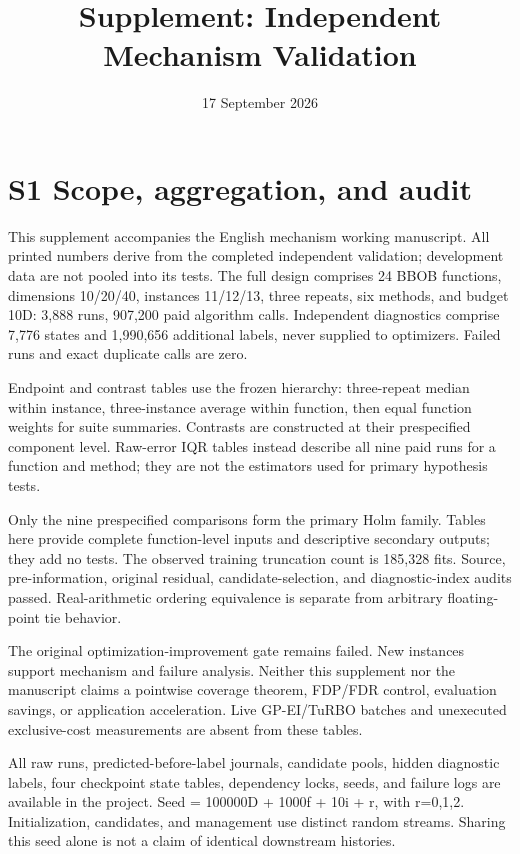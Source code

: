 \documentclass[11pt,a4paper]{article}
\title{Supplement: Independent Mechanism Validation}
\author{}
\date{17 September 2026}
\begin{document}
\maketitle

\hypertarget{s1-scope-aggregation-and-audit}{%
\section{S1 Scope, aggregation, and
audit}\label{s1-scope-aggregation-and-audit}}

This supplement accompanies the English mechanism working manuscript.
All printed numbers derive from the completed independent validation;
development data are not pooled into its tests. The full design
comprises 24 BBOB functions, dimensions 10/20/40, instances 11/12/13,
three repeats, six methods, and budget 10D: 3,888 runs, 907,200 paid
algorithm calls. Independent diagnostics comprise 7,776 states and
1,990,656 additional labels, never supplied to optimizers. Failed runs
and exact duplicate calls are zero.

Endpoint and contrast tables use the frozen hierarchy: three-repeat
median within instance, three-instance average within function, then
equal function weights for suite summaries. Contrasts are constructed at
their prespecified component level. Raw-error IQR tables instead
describe all nine paid runs for a function and method; they are not the
estimators used for primary hypothesis tests.

Only the nine prespecified comparisons form the primary Holm family.
Tables here provide complete function-level inputs and descriptive
secondary outputs; they add no tests. The observed training truncation
count is 185,328 fits. Source, pre-information, original residual,
candidate-selection, and diagnostic-index audits passed. Real-arithmetic
ordering equivalence is separate from arbitrary floating-point tie
behavior.

The original optimization-improvement gate remains failed. New instances
support mechanism and failure analysis. Neither this supplement nor the
manuscript claims a pointwise coverage theorem, FDP/FDR control,
evaluation savings, or application acceleration. Live GP-EI/TuRBO
batches and unexecuted exclusive-cost measurements are absent from these
tables.

All raw runs, predicted-before-label journals, candidate pools, hidden
diagnostic labels, four checkpoint state tables, dependency locks,
seeds, and failure logs are available in the project. Seed = 100000D +
1000f + 10i + r, with r=0,1,2. Initialization, candidates, and
management use distinct random streams. Sharing this seed alone is not a
claim of identical downstream histories.
\end{document}
